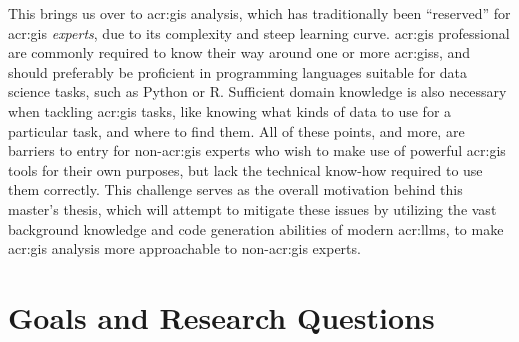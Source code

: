 This brings us over to \gls{acr:gis} analysis, which has traditionally been \enquote{reserved} for \acrshort{acr:gis} \textit{experts}, due to its complexity and steep learning curve. \acrshort{acr:gis} professional are commonly required to know their way around one or more \glspl{acr:gis}, and should preferably be proficient in programming languages suitable for data science tasks, such as Python or R. Sufficient domain knowledge is also necessary when tackling \acrshort{acr:gis} tasks, like knowing what kinds of data to use for a particular task, and where to find them. All of these points, and more, are barriers to entry for non-\acrshort{acr:gis} experts who wish to make use of powerful \acrshort{acr:gis} tools for their own purposes, but lack the technical know-how required to use them correctly. This challenge serves as the overall motivation behind this master's thesis, which will attempt to mitigate these issues by utilizing the vast background knowledge and code generation abilities of modern \glspl{acr:llm}, to make \acrshort{acr:gis} analysis more approachable to non-\acrshort{acr:gis} experts.

\section{Goals and Research Questions}
\label{sec:goals-and-research-questions}

